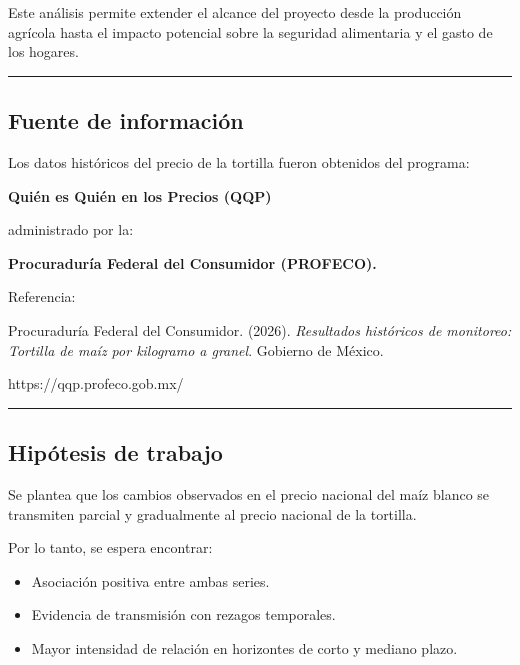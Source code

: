 \documentclass[11pt]{article}
\providecommand{\tightlist}{%
      \setlength{\itemsep}{0pt}\setlength{\parskip}{0pt}}
\begin{document}
Este análisis permite extender el alcance del proyecto desde la
producción agrícola hasta el impacto potencial sobre la seguridad
alimentaria y el gasto de los hogares.

\begin{center}\rule{0.5\linewidth}{0.5pt}\end{center}

\hypertarget{fuente-de-informaciuxf3n}{%
\subsection{Fuente de información}\label{fuente-de-informaciuxf3n}}

Los datos históricos del precio de la tortilla fueron obtenidos del
programa:

\textbf{Quién es Quién en los Precios (QQP)}

administrado por la:

\textbf{Procuraduría Federal del Consumidor (PROFECO).}

Referencia:

Procuraduría Federal del Consumidor. (2026). \emph{Resultados históricos
de monitoreo: Tortilla de maíz por kilogramo a granel}. Gobierno de
México.

https://qqp.profeco.gob.mx/

\begin{center}\rule{0.5\linewidth}{0.5pt}\end{center}

\hypertarget{hipuxf3tesis-de-trabajo}{%
\subsection{Hipótesis de trabajo}\label{hipuxf3tesis-de-trabajo}}

Se plantea que los cambios observados en el precio nacional del maíz
blanco se transmiten parcial y gradualmente al precio nacional de la
tortilla.

Por lo tanto, se espera encontrar:

\begin{itemize}
\tightlist
\item
  Asociación positiva entre ambas series.
\item
  Evidencia de transmisión con rezagos temporales.
\item
  Mayor intensidad de relación en horizontes de corto y mediano plazo.
\end{itemize}
\end{document}

